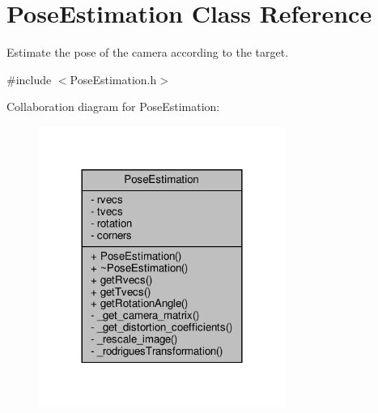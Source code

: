 \hypertarget{class_pose_estimation}{}\section{Pose\+Estimation Class Reference}
\label{class_pose_estimation}


Estimate the pose of the camera according to the target.  




{\ttfamily \#include $<$Pose\+Estimation.\+h$>$}



Collaboration diagram for Pose\+Estimation\+:
\nopagebreak
\begin{figure}[H]
\begin{center}
\leavevmode
\includegraphics[width=228pt]{class_pose_estimation__coll__graph}
\end{center}
\end{figure}
